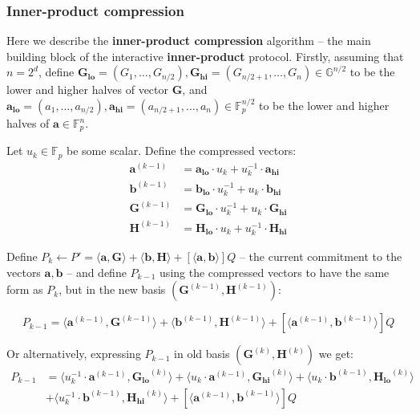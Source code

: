 \documentclass[../lecture-notes-148x210.tex]{subfiles}
\begin{document}
\subsubsection{Inner-product compression}

Here we describe the \textbf{inner-product compression} algorithm -- the main building block of the interactive \textbf{inner-product} protocol.
Firstly, assuming that $n = 2^d$, define $\mathbf{G_{lo}} = (G_1, \dots, G_{n/2}), \mathbf{G_{hi}} = (G_{n/2+1},\dots, G_n) \in \mathbb{G}^{n/2}$ to be the lower and higher halves of vector $\mathbf{G}$, and $\mathbf{a_{lo}} = (a_1, \dots, a_{n/2}), \mathbf{a_{hi}} = (a_{n/2+1},\dots,a_n) \in \mathbb{F}_p^{n/2}$ to be the lower and higher halves of $\mathbf{a} \in \mathbb{F}_p^{n}$.

Let $u_k \in \mathbb{F}_p$ be some scalar. Define the compressed vectors:
\begin{align*}
    \mathbf{a}^{(k-1)} &= \mathbf{a_{lo}} \cdot u_k + u_k^{-1} \cdot \mathbf{a_{hi}} \\
    \mathbf{b}^{(k-1)} &= \mathbf{b_{lo}} \cdot u_k^{-1} + u_k \cdot \mathbf{b_{hi}} \\
    \mathbf{G}^{(k-1)} &= \mathbf{G_{lo}} \cdot u_k^{-1} + u_k \cdot \mathbf{G_{hi}} \\
    \mathbf{H}^{(k-1)} &= \mathbf{H_{lo}} \cdot u_k + u_k^{-1} \cdot \mathbf{H_{hi}}
\end{align*}

Define $P_k \gets P' =  \langle \mathbf{a,G} \rangle + \langle \mathbf{b,H} \rangle + [\langle \mathbf{a,b} \rangle]Q$ -- the current commitment to the vectors $\mathbf{a,b}$ -- and define $P_{k-1}$ using the compressed vectors to have the same form as $P_k$, but in the new basis $(\mathbf{G}^{(k-1)}, \mathbf{H}^{(k-1)})$:

\begin{equation}
    P_{k-1} = \langle \mathbf{a}^{(k-1)}, \mathbf{G}^{(k-1)} \rangle + \langle \mathbf{b}^{(k-1)}, \mathbf{H}^{(k-1)} \rangle + [\langle \mathbf{a}^{(k-1)}, \mathbf{b}^{(k-1)} \rangle]Q
    \label{eq:p_k_1_from_new_basis}
\end{equation}

Or alternatively, expressing $P_{k-1}$ in old basis $(\mathbf{G}^{(k)}, \mathbf{H}^{(k)})$ we get:
\begin{equation}
    \begin{aligned}
    P_{k-1} &= \langle u_k^{-1} \cdot \mathbf{a}^{(k-1)}, \mathbf{G_{lo}}^{(k)} \rangle + \langle u_k \cdot \mathbf{a}^{(k-1)}, \mathbf{G_{hi}}^{(k)} \rangle + \langle u_k \cdot \mathbf{b}^{(k-1)}, \mathbf{H_{lo}}^{(k)} \rangle \\
    &+ \langle u_k^{-1} \cdot \mathbf{b}^{(k-1)}, \mathbf{H_{hi}}^{(k)} \rangle + [\langle \mathbf{a}^{(k-1)}, \mathbf{b}^{(k-1)} \rangle]Q
    \label{eq:p_k_1_from_old_basis}
    \end{aligned}
\end{equation}
\end{document}
